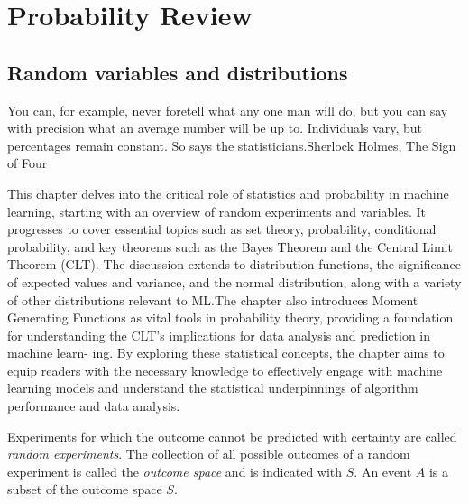 \documentclass[a4paper, 12pt]{book}
\begin{document}

\chapter{Probability Review}
\label{ch:prob}

\section{Random variables and distributions}

\begin{epigraph}
    {You can, for example, never foretell what any one man will do, but you can say with precision what an average number will be up to. Individuals vary, but percentages remain constant. So says the statisticians.}{Sherlock Holmes, The Sign of Four}
\end{epigraph}

This chapter delves into the critical role of statistics and probability in machine learning, starting with an overview of random experiments and variables. It progresses to cover essential topics such as set theory, probability, conditional probability, and key theorems such as the Bayes Theorem and the Central Limit Theorem (CLT). The discussion extends to distribution functions, the significance of expected values and variance,
and the normal distribution, along with a variety of other distributions relevant to ML.The chapter also introduces Moment Generating Functions as vital tools in probability theory, providing a foundation for understanding the CLT's implications for data analysis and prediction in machine learn-
ing. By exploring these statistical concepts, the chapter aims to equip readers with the necessary knowledge to effectively engage with machine learning models and understand the statistical underpinnings of algorithm performance and data analysis.

\begin{definition}
    Experiments for which the outcome cannot be predicted with certainty are called \emph{random experiments}. The collection of all possible outcomes of a random experiment is called the \emph{outcome space} and is indicated with $S$. An event $A$ is a subset of the outcome space $S$.
\end{definition}
\end{document}
